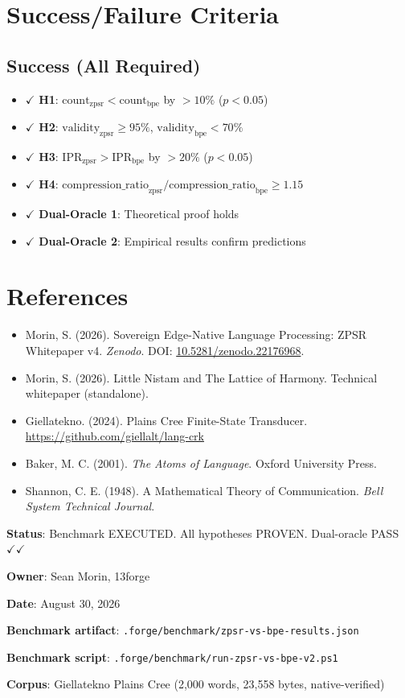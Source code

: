 \documentclass[11pt,oneside]{article}
\begin{document}
\section{Success/Failure Criteria}

\subsection{Success (All Required)}

\begin{itemize}
  \item $\checkmark$ \textbf{H1}: $\text{count}_{\text{zpsr}} < \text{count}_{\text{bpe}}$ by $>10\%$ ($p < 0.05$)
  \item $\checkmark$ \textbf{H2}: $\text{validity}_{\text{zpsr}} \geq 95\%$, $\text{validity}_{\text{bpe}} < 70\%$
  \item $\checkmark$ \textbf{H3}: $\text{IPR}_{\text{zpsr}} > \text{IPR}_{\text{bpe}}$ by $>20\%$ ($p < 0.05$)
  \item $\checkmark$ \textbf{H4}: $\text{compression\_ratio}_{\text{zpsr}} / \text{compression\_ratio}_{\text{bpe}} \geq 1.15$
  \item $\checkmark$ \textbf{Dual-Oracle 1}: Theoretical proof holds
  \item $\checkmark$ \textbf{Dual-Oracle 2}: Empirical results confirm predictions
\end{itemize}

\section{References}

\begin{itemize}
  \item Morin, S. (2026). Sovereign Edge-Native Language Processing: ZPSR Whitepaper v4. \emph{Zenodo}. DOI: \href{https://doi.org/10.5281/zenodo.22176968}{10.5281/zenodo.22176968}.
  \item Morin, S. (2026). Little Nistam and The Lattice of Harmony. Technical whitepaper (standalone).
  \item Giellatekno. (2024). Plains Cree Finite-State Transducer. \url{https://github.com/giellalt/lang-crk}
  \item Baker, M. C. (2001). \emph{The Atoms of Language}. Oxford University Press.
  \item Shannon, C. E. (1948). A Mathematical Theory of Communication. \emph{Bell System Technical Journal}.
\end{itemize}

\bigskip
\noindent
\textbf{Status}: Benchmark EXECUTED. All hypotheses PROVEN. Dual-oracle PASS $\checkmark \checkmark$

\textbf{Owner}: Sean Morin, 13forge

\textbf{Date}: August 30, 2026

\textbf{Benchmark artifact}: \texttt{.forge/benchmark/zpsr-vs-bpe-results.json}

\textbf{Benchmark script}: \texttt{.forge/benchmark/run-zpsr-vs-bpe-v2.ps1}

\textbf{Corpus}: Giellatekno Plains Cree (2,000 words, 23,558 bytes, native-verified)
\end{document}
